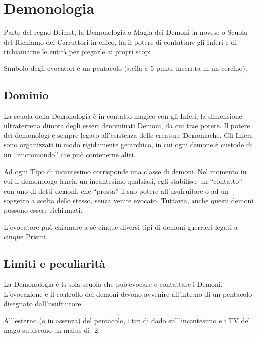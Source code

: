 \vfill{}

\iffullversion
\clearpage\section{Demonologia} 


Parte del regno Deimst, la Demonologia o Magia dei Demoni in novese o
Scuola del Richiamo dei Corruttori in elfico, ha il potere di
contattare gli Inferi e di richiamarne le entit\`a per piegarle ai
propri scopi.

Simbolo degli evocatori \`e un pentacolo (stella a 5 punte inscritta
in un cerchio).

\subsection{Dominio} 

La scuola della Demonologia \`e in contatto magico con gli Inferi,
la dimensione ultraterrena dimora degli esseri denominati Demoni, da
cui trae potere. Il potere dei demonologi \`e sempre legato
all'esistenza delle creature Demoniache. Gli Inferi sono organizzati
in modo rigidamente gerarchico, in cui ogni demone \`e custode di un
``micromondo'' che pu\`o contenerne altri.

Ad ogni Tipo di incantesimo corrisponde una classe di demoni. Nel
momento in cui il demonologo lancia un incantesimo qualsiasi, egli
stabilisce un ``contatto'' con uno di detti demoni, che ``presta'' il
suo potere all'usufruitore o ad un soggetto a scelta dello stesso,
senza venire evocato. Tuttavia, anche questi demoni possono essere
richiamati.

L'evocatore pu\`o chiamare a s\'e cinque diversi tipi di demoni
guerrieri legati a cinque Prismi.

\subsection{Limiti e peculiarit\`a} 

La Demonologia \`e la sola scuola che pu\`o evocare e contattare i
Demoni.  L'evocazione e il controllo dei demoni devono avvenire
all'interno di un pentacolo disegnato dall'usufruitore.

All'esterno (o in assenza) del pentacolo, i tiri di dado
sull'incantesimo e i TV del mago subiscono un malus di -2.

